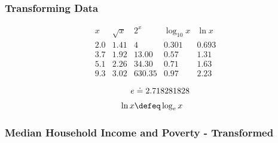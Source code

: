 \documentclass{beamer}
\begin{document}
\begin{frame}
  \frametitle{Transforming Data}
  \centering
  \begin{displaymath}
    \begin{array}{ccccc}
      x & \sqrt{x} & 2^x & \log_{10} x & \ln x \\[0.3em] \hline
      2.0 & 1.41 & 4 & 0.301 & 0.693  \\[0.3em]
      3.7 & 1.92 & 13.00 & 0.57 & 1.31  \\[0.3em]
      5.1 & 2.26 & 34.30 & 0.71 & 1.63  \\[0.3em]
      9.3 & 3.02 & 630.35 & 0.97 & 2.23  \\[0.3em]
    \end{array} 
  \end{displaymath}
  \begin{align*}
    \vspace{1cm}
    e & \doteq 2.718281828 \\[0.3em]
    \ln x & \defeq \log_e x
  \end{align*}
\end{frame}

\begin{frame}
  \frametitle{Median Household Income and Poverty - Transformed}
  \centering
\end{frame}
\end{document}

